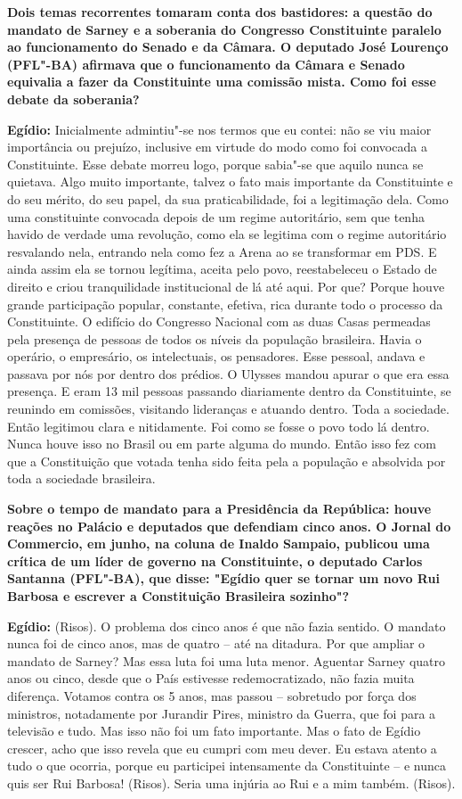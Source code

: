 \textbf{Dois temas recorrentes tomaram conta dos bastidores: a questão
do mandato de Sarney e a soberania do Congresso Constituinte paralelo ao
funcionamento do Senado e da Câmara. O deputado José Lourenço (PFL"-BA)
afirmava que o funcionamento da Câmara e Senado equivalia a fazer da
Constituinte uma comissão mista. Como foi esse debate da soberania?}

\textbf{Egídio:} Inicialmente admintiu"-se nos termos que eu contei: não
se viu maior importância ou prejuízo, inclusive em virtude do modo como
foi convocada a Constituinte. Esse debate morreu logo, porque sabia"-se
que aquilo nunca se quietava. Algo muito importante, talvez o fato mais
importante da Constituinte e do seu mérito, do seu papel, da sua
praticabilidade, foi a legitimação dela. Como uma constituinte convocada
depois de um regime autoritário, sem que tenha havido de verdade uma
revolução, como ela se legitima com o regime autoritário resvalando
nela, entrando nela como fez a Arena ao se transformar em PDS. E ainda
assim ela se tornou legítima, aceita pelo povo, reestabeleceu o Estado
de direito e criou tranquilidade institucional de lá até aqui. Por que?
Porque houve grande participação popular, constante, efetiva, rica
durante todo o processo da Constituinte. O edifício do Congresso
Nacional com as duas Casas permeadas pela presença de pessoas de todos
os níveis da população brasileira. Havia o operário, o empresário, os
intelectuais, os pensadores. Esse pessoal, andava e passava por nós por
dentro dos prédios. O Ulysses mandou apurar o que era essa presença. E
eram 13 mil pessoas passando diariamente dentro da Constituinte, se
reunindo em comissões, visitando lideranças e atuando dentro. Toda a
sociedade. Então legitimou clara e nitidamente. Foi como se fosse o povo
todo lá dentro. Nunca houve isso no Brasil ou em parte alguma do mundo.
Então isso fez com que a Constituição que votada tenha sido feita pela a
população e absolvida por toda a sociedade brasileira.

\textbf{Sobre o tempo de mandato para a Presidência da República: houve
reações no Palácio e deputados que defendiam cinco anos. O Jornal do
Commercio, em junho, na coluna de Inaldo Sampaio, publicou uma crítica
de um líder de governo na Constituinte, o deputado Carlos Santanna
(PFL"-BA), que disse: "Egídio quer se tornar um novo Rui Barbosa e
escrever a Constituição Brasileira sozinho"?}

\textbf{Egídio:} (Risos). O problema dos cinco anos é que não fazia
sentido. O mandato nunca foi de cinco anos, mas de quatro -- até na
ditadura. Por que ampliar o mandato de Sarney? Mas essa luta foi uma
luta menor. Aguentar Sarney quatro anos ou cinco, desde que o País
estivesse redemocratizado, não fazia muita diferença. Votamos contra os
5 anos, mas passou -- sobretudo por força dos ministros, notadamente por
Jurandir Pires, ministro da Guerra, que foi para a televisão e tudo. Mas
isso não foi um fato importante. Mas o fato de Egídio crescer, acho que
isso revela que eu cumpri com meu dever. Eu estava atento a tudo o que
ocorria, porque eu participei intensamente da Constituinte -- e nunca
quis ser Rui Barbosa! (Risos). Seria uma injúria ao Rui e a mim também.
(Risos).

